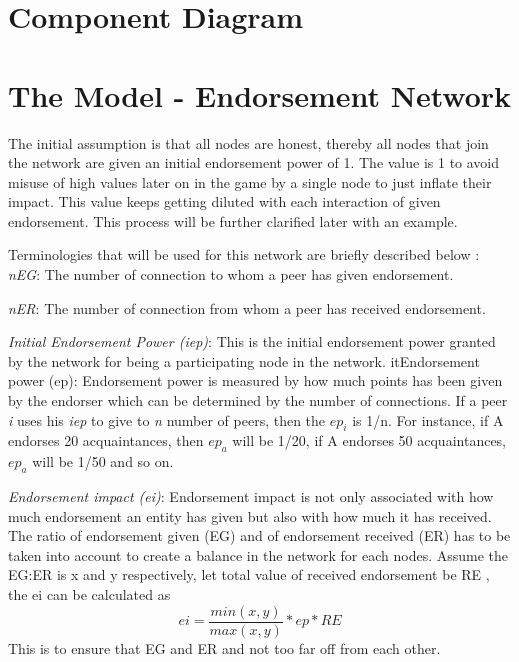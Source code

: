 \section{Component Diagram}



\section{The Model - Endorsement Network}
The initial assumption is that all nodes are honest, thereby all nodes that join 
the network are given an initial endorsement power of 1. The value is 1 to avoid 
misuse of high values later on in the game by a single node to just inflate their 
impact. This value keeps getting diluted with each interaction of given  
endorsement. This process will be further clarified later with an example.

Terminologies that will be used for this network are briefly described below : \\
\textit{nEG}: The number of connection to whom a peer has given endorsement.

\textit{nER}: The number of connection from whom a peer has received endorsement. 


\textit{Initial Endorsement Power (iep)}: This is the initial endorsement power 
granted by the network for being a participating node in the network. 
it{Endorsement power (ep):} Endorsement power is measured by how much points 
has been given by the endorser which can be determined by the number of 
connections. If a peer \textit{i} uses his \textit{iep} to give to \textit{n} 
number of peers, then the $ep_i$ is 1/n. For instance, if A endorses 
20 acquaintances, then $ep_a$ will be 1/20, if A endorses 50 
acquaintances, $ep_a$ will be 1/50 and so on. 

\textit{Endorsement impact (ei)}: Endorsement impact is not only associated with 
how much endorsement an entity has given but also with how much it has received. 
The ratio of endorsement given (EG) and of endorsement received (ER) has to be 
taken into account to create a balance in the network for each nodes. Assume the 
EG:ER is x and y respectively, let total value of received endorsement be RE , 
the ei can be calculated as \\
\begin{equation}
	ei = \frac{min(x,y)}{max(x,y)} * ep * RE 
\end{equation}
This is to ensure that EG and ER and not too far off from each other. \\ 

